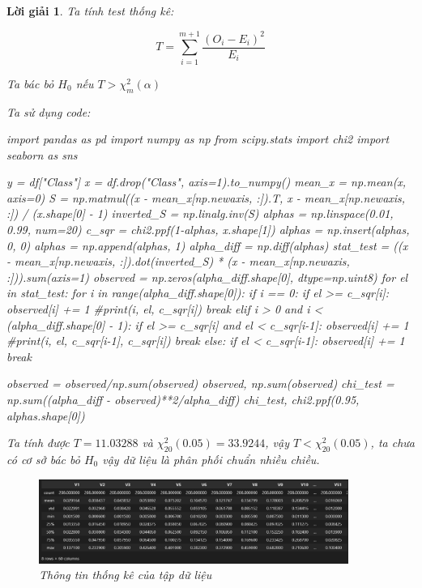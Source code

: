 \documentclass[14pt, a4paper]{article}
\theoremstyle{sltheorem}
\theoremstyle{soltheorem}
\newtheorem*{loigiai}{Lời giải}
\begin{document}
\begin{loigiai}
    Ta tính test thống kê:

    \begin{equation*}
        T = \sum_{i=1}^{m+1} \dfrac{(O_i - E_i)^2}{E_i}
    \end{equation*}

    Ta bác bỏ $H_0$ nếu $T > \chi_m^2(\alpha)$

    Ta sử dụng code:

    \begin{python}
import pandas as pd
import numpy as np
from scipy.stats import chi2
import seaborn as sns

y = df["Class"]
x = df.drop("Class", axis=1).to_numpy()
mean_x = np.mean(x, axis=0)
S = np.matmul((x - mean_x[np.newaxis, :]).T, x - mean_x[np.newaxis, :]) / (x.shape[0] - 1)
inverted_S = np.linalg.inv(S)
alphas = np.linspace(0.01, 0.99, num=20)
c_sqr = chi2.ppf(1-alphas, x.shape[1])
alphas = np.insert(alphas, 0, 0)
alphas = np.append(alphas, 1)
alpha_diff = np.diff(alphas)
stat_test = ((x - mean_x[np.newaxis, :]).dot(inverted_S) * (x - mean_x[np.newaxis, :])).sum(axis=1)
observed = np.zeros(alpha_diff.shape[0], dtype=np.uint8)
for el in stat_test:
    for i in range(alpha_diff.shape[0]):
        if i == 0:
            if el >= c_sqr[i]:
                observed[i] += 1
                #print(i, el, c_sqr[i])
                break
        elif i > 0 and i < (alpha_diff.shape[0] - 1):
            if el >= c_sqr[i] and el < c_sqr[i-1]:
                observed[i] += 1
                #print(i, el, c_sqr[i-1], c_sqr[i])
                break
        else:
            if el < c_sqr[i-1]:
                observed[i] += 1
                break
            
                
observed = observed/np.sum(observed)
observed, np.sum(observed)
chi_test = np.sum((alpha_diff - observed)**2/alpha_diff)
chi_test, chi2.ppf(0.95, alphas.shape[0])
    \end{python}
    
    Ta tính được $T=11.03288$ và $\chi_{20}^2(0.05)=33.9244$, vậy $T < \chi_{20}^2(0.05)$, ta chưa có cơ sở bác bỏ $H_0$ vậy dữ liệu là phân phối chuẩn nhiều chiều.

    \begin{figure}[h!]
        \centering
        \includegraphics[width=0.9\textwidth]{figures/raw_summary.png}
        \caption{Thông tin thống kê của tập dữ liệu}
        \label{fig:raw_summary}
    \end{figure}


\end{loigiai}
\end{document}
